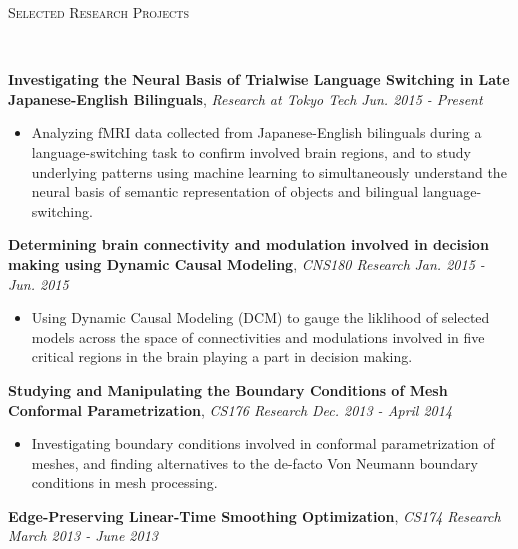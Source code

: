 \documentclass[9pt]{article}
\newenvironment{changemargin}[2]{%
  \begin{list}{}{%
    \setlength{\topsep}{0pt}%
    \setlength{\leftmargin}{#1}%
    \setlength{\rightmargin}{#2}%
    \setlength{\listparindent}{\parindent}%
    \setlength{\itemindent}{\parindent}%
    \setlength{\parsep}{\parskip}%
  }%
  \item[]}{\end{list}
}
\newcommand{\lineover}{
	\begin{changemargin}{-0.05in}{-0.05in}
		\vspace*{-8pt}
		\hrulefill \\
		\vspace*{-2pt}
	\end{changemargin}
}
\newcommand{\header}[1]{
	\begin{changemargin}{-0.5in}{-0.5in}
		\scshape{#1}\\
  	\lineover
	\end{changemargin}
}
\newenvironment{body} {
	\vspace*{-16pt}
	\begin{changemargin}{-0.25in}{-0.5in}
  }	
	{\end{changemargin}
}
\begin{document}
\header{Selected Research Projects}
\begin{body}
	\vspace{18pt}
	\textbf{Investigating the Neural Basis of Trialwise Language Switching in Late Japanese-English Bilinguals}, \emph{Research at Tokyo Tech} \hfill \emph{Jun. 2015 - Present} \\
		\vspace*{-3pt}
	\begin{itemize} \itemsep -0pt
	\item Analyzing fMRI data collected from Japanese-English bilinguals during a language-switching task to confirm involved brain regions, and to study underlying patterns using machine learning to simultaneously understand the neural basis of semantic representation of objects and bilingual language-switching.
	\end{itemize}
	\textbf{Determining brain connectivity and modulation involved in decision making using Dynamic Causal Modeling}, \emph{CNS180 Research} \hfill \emph{Jan. 2015 - Jun. 2015} \\
		\vspace*{-3pt}
	\begin{itemize} \itemsep -0pt
	\item Using Dynamic Causal Modeling (DCM) to gauge the liklihood of selected models across the space of connectivities and modulations involved in five critical regions in the brain playing a part in decision making.
	\end{itemize}
	\textbf{Studying and Manipulating the Boundary Conditions of Mesh Conformal Parametrization}, \emph{CS176 Research} \hfill \emph{Dec. 2013 - April 2014} \\
		\vspace*{-3pt}
	\begin{itemize} \itemsep -0pt
	\item Investigating boundary conditions involved in conformal parametrization of meshes, and finding alternatives to the de-facto Von Neumann boundary conditions in mesh processing.
	\end{itemize}
	\textbf{Edge-Preserving Linear-Time Smoothing Optimization}, \emph{CS174 Research} \hfill \emph{March 2013 - June 2013} \\
		\vspace*{-3pt}

\end{body}
\end{document}
